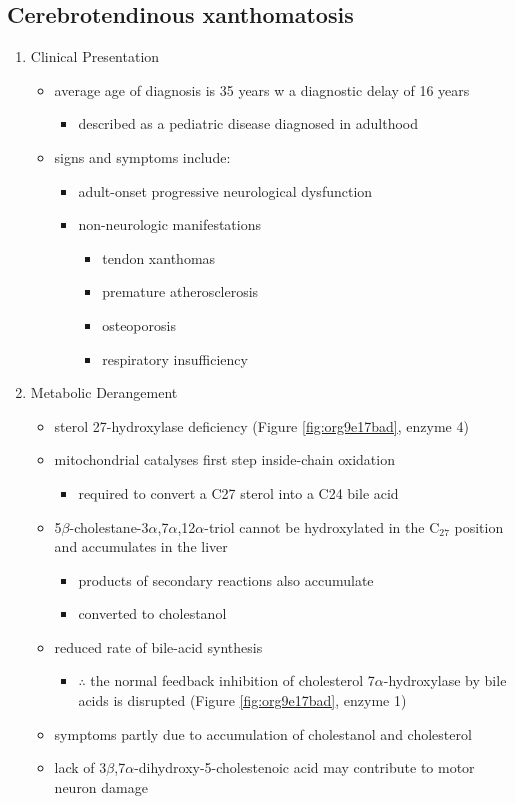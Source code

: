 \documentclass{scrartcl}
\begin{document}
\subsection{Cerebrotendinous xanthomatosis}
\label{sec:orgbf523c7}
\begin{enumerate}
\item Clinical Presentation
\label{sec:orga1ff40e}
\begin{itemize}
\item average age of diagnosis is 35 years w a diagnostic delay of 16 years
\begin{itemize}
\item described as a pediatric disease diagnosed in adulthood
\end{itemize}
\item signs and symptoms include:
\begin{itemize}
\item adult-onset progressive neurological dysfunction
\item non-neurologic manifestations
\begin{itemize}
\item tendon xanthomas
\item premature atherosclerosis
\item osteoporosis
\item respiratory insufficiency
\end{itemize}
\end{itemize}
\end{itemize}

\item Metabolic Derangement
\label{sec:orgbc76d63}
\begin{itemize}
\item sterol 27-hydroxylase deficiency (Figure \ref{fig:org9e17bad}, enzyme 4)
\item mitochondrial catalyses first step inside-chain oxidation
\begin{itemize}
\item required to convert a C27 sterol into a C24 bile acid
\end{itemize}
\item 5\(\beta\)-cholestane-3\(\alpha\),7\(\alpha\),12\(\alpha\)-triol cannot be hydroxylated in the C\(_{\text{27}}\)
position and accumulates in the liver
\begin{itemize}
\item products of secondary reactions also accumulate
\item converted to cholestanol
\end{itemize}
\item reduced rate of bile-acid synthesis
\begin{itemize}
\item \(\therefore\) the normal feedback inhibition of cholesterol
7\(\alpha\)-hydroxylase by bile acids is disrupted (Figure \ref{fig:org9e17bad}, enzyme 1)
\end{itemize}
\item symptoms partly due to accumulation of cholestanol and cholesterol
\item lack of 3\(\beta\),7\(\alpha\)-dihydroxy-5-cholestenoic acid may contribute to motor
neuron damage
\end{itemize}


\end{enumerate}
\end{document}
